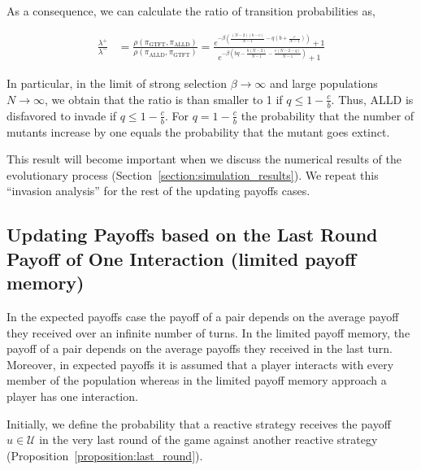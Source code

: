 \documentclass[11pt]{article}
\theoremstyle{plainCl1}
\theoremstyle{plainCl2}
\begin{document}
As a consequence, we can calculate the ratio of transition probabilities as,

\begin{align*}
    \frac{\lambda^{+}}{\lambda^{-}} & = \frac{\rho(\pi_{\text{GTFT}}, \pi_{\text{ALLD}})}{\rho(\pi_{\text{ALLD}}, \pi_{\text{GTFT}})}  = \frac{e^{-\beta \left(\frac{(N-2) (b-c)}{N-1} - q (b + \frac{c}{N-1})\right)}+1}
    {e^{-\beta\left(b q - \frac{b (N - 2)}{N-1} - \frac{c (N - 2 - q)}{N-1}\right)}+1}
\end{align*}

In particular, in the limit of strong selection \(\beta \rightarrow \infty\)
and large populations \(N \rightarrow \infty\), we obtain that the ratio is than
smaller to 1 if \(q \leq 1 - \frac{c}{b}\). Thus, ALLD is disfavored to invade
if \(q \leq 1 - \frac{c}{b}\). For \(q = 1 -\frac{c}{b}\) the probability that
the number of mutants increase by one equals the probability that the mutant
goes extinct.

This result will become important when we discuss the numerical results of the
evolutionary process (Section~\ref{section:simulation_results}). We repeat this
``invasion analysis'' for the rest of the updating payoffs cases.

\subsection{Updating Payoffs based on the Last Round Payoff of One Interaction (limited payoff memory)}\label{section:limited_memory}

In the expected payoffs case the payoff of a pair depends on the average payoff
they received over an infinite number of turns. In the limited payoff memory,
the payoff of a pair depends on the average payoffs they received in the last
turn. Moreover, in expected payoffs it is assumed that a player interacts with
every member of the population whereas in the limited payoff memory approach a
player has one interaction.

Initially, we define the probability that a reactive strategy receives the
payoff $u\!\in\! \mathcal{U}$ in the very last round of the game against another
reactive strategy (Proposition~\ref{proposition:last_round}).
\end{document}
